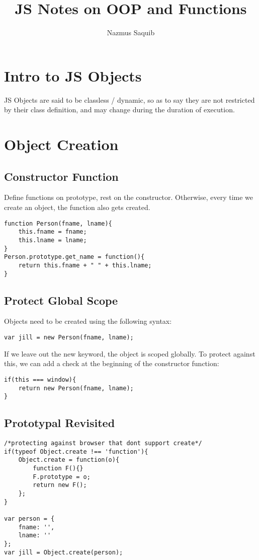 \documentclass[12pt, a4paper]{article}
\begin{document}
\title{JS Notes on OOP and Functions}
\author{Nazmus Saquib}

\maketitle
\tableofcontents

\section{Intro to JS Objects}
JS Objects are said to be classless / dynamic, so as to say they are not restricted by their class definition,
 and may change during the duration of execution.

\section{Object Creation}
\subsection{Constructor Function}
Define functions on prototype, rest on the constructor. Otherwise, every time we create an object,
the function also gets created.
\begin{verbatim}
function Person(fname, lname){
    this.fname = fname;
    this.lname = lname;
}
Person.prototype.get_name = function(){
    return this.fname + " " + this.lname;
}
\end{verbatim}
\subsection{Protect Global Scope}
Objects need to be created using the following syntax:
\begin{verbatim}
var jill = new Person(fname, lname);
\end{verbatim}
If we leave out the new keyword, the object is scoped globally. To protect against this, we can add 
a check at the beginning of the constructor function:
\begin{verbatim}
if(this === window){
    return new Person(fname, lname);
}
\end{verbatim}
\subsection{Prototypal Revisited}
\begin{verbatim}
/*protecting against browser that dont support create*/
if(typeof Object.create !== 'function'){
    Object.create = function(o){
        function F(){}
        F.prototype = o;
        return new F();
    };
}

var person = {
    fname: '',
    lname: ''
};
var jill = Object.create(person);
\end{verbatim}
\end{document}
